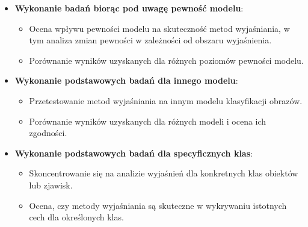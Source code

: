 \begin{itemize}
	\item \textbf{Wykonanie badań biorąc pod uwagę pewność modelu}:
	      \begin{itemize}
		      \item Ocena wpływu pewności modelu na skuteczność metod wyjaśniania, w tym analiza zmian pewności w zależności od obszaru wyjaśnienia.
		      \item Porównanie wyników uzyskanych dla różnych poziomów pewności modelu.
	      \end{itemize}

	\item \textbf{Wykonanie podstawowych badań dla innego modelu}:
	      \begin{itemize}
		      \item Przetestowanie metod wyjaśniania na innym modelu klasyfikacji obrazów.
		      \item Porównanie wyników uzyskanych dla różnych modeli i ocena ich zgodności.
	      \end{itemize}

	\item \textbf{Wykonanie podstawowych badań dla specyficznych klas}:
	      \begin{itemize}
		      \item Skoncentrowanie się na analizie wyjaśnień dla konkretnych klas obiektów lub zjawisk.
		      \item Ocena, czy metody wyjaśniania są skuteczne w wykrywaniu istotnych cech dla określonych klas.
	      \end{itemize}
\end{itemize}
